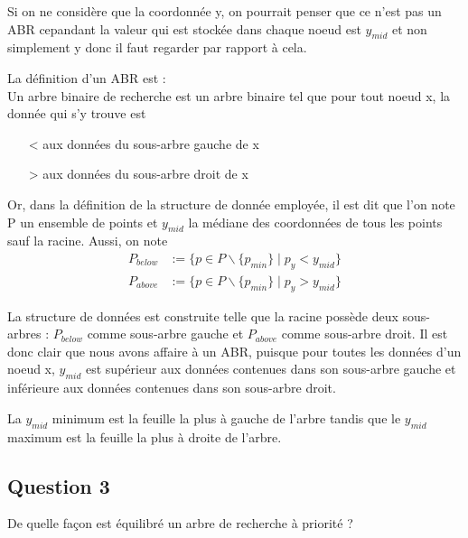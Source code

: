 \documentclass{article}
\newcommand{\gray}{\color{gray}}
\begin{document}
\bigskip

Si on ne considère que la coordonnée y, on pourrait penser que ce n'est pas un ABR cepandant la valeur qui est stockée dans chaque noeud
est $y_{mid}$ et non simplement y donc il faut regarder par rapport à cela.

\medskip

La définition d'un ABR est : \\
Un arbre binaire de recherche est un arbre binaire tel que pour tout noeud x, la donnée qui s'y trouve est
\begin{itemize}
    \item[<] aux données du sous-arbre gauche de x
    \item[>] aux données du sous-arbre droit de x 
\end{itemize}
Or, dans la définition de la structure de donnée employée, il est dit que l'on note P un ensemble de points et $y_{mid}$ la médiane des coordonnées de tous
les points sauf la racine. Aussi, on note 
\begin{align}
    P_{below} &:= \{p \in P\backslash \{ p_{min} \} \mid p_y < y_{mid}\} \nonumber\\
    P_{above} &:= \{p \in P\backslash \{ p_{min} \} \mid p_y > y_{mid}\} \nonumber
\end{align}

La structure de données est construite telle que la racine possède deux sous-arbres : $P_{below}$ comme sous-arbre gauche
et $P_{above}$ comme sous-arbre droit. Il est donc clair que nous avons affaire à un ABR, puisque pour toutes les données d'un noeud x, 
$y_{mid}$ est supérieur aux données contenues dans son sous-arbre gauche et inférieure aux données contenues dans son sous-arbre droit.

\medskip

La $y_{mid}$ minimum est la feuille la plus à gauche de l'arbre tandis que le $y_{mid}$ maximum est la feuille la plus à droite de l'arbre.



\subsection{Question 3} De quelle façon est équilibré un arbre de recherche à priorité ?

\bigskip

\gray
\end{document}
